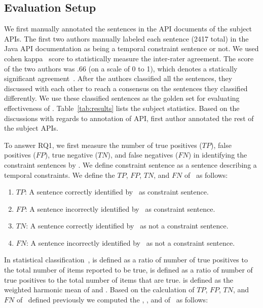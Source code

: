 \subsection{Evaluation Setup} 
We first manually annotated the sentences in the API documents of the subject APIs.
The first two authors manually labeled each sentence (2417 total) in the Java API documentation as being a temporal constraint sentence or not.
We used cohen kappa~\cite{carletta1996assessing} score to statistically measure
the inter-rater agreement.
The  score of the two authors was .66 (on a scale of 0 to 1), 
which denotes a statically significant agreement~\cite{carletta1996assessing}. 
After the authors classified all the sentences, they 
discussed with each other to reach a consensus on the sentences they classified differently.
We use these classified sentences as the golden set for evaluating effectiveness of \tool.
Table~\ref{tab:results} lists the subject statistics.
Based on the discussions with regards to annotation of  API, first author annotated the rest of the subject APIs. 



To answer RQ1, we first measure the number of true positives ($TP$), false positives ($FP$), true negative ($TN$), and false negatives ($FN$)
in identifying the constraint sentences by \tool.
We define constraint sentence as a sentence describing a temporal constraints.
We define the $TP$, $FP$, $TN$, and $FN$ of \tool\ as follows:

\begin{enumerate}
	\item $TP$: A sentence correctly identified by \tool\ as constraint sentence.
	\item $FP$: A sentence incorrectly identified by \tool\ as constraint sentence.
	\item $TN$: A sentence correctly identified by \tool\ as not a constraint sentence.
	\item $FN$: A sentence incorrectly identified by \tool\ as not a constraint sentence.
\end{enumerate}


In statistical classification~\cite{Olson08},  is defined as a ratio of
number of true positives to the total number of items reported to be true,
 is defined as a ratio of number of true positives to the total number
of items that are true.  is defined as the weighted harmonic mean of 
 and .
Based on the calculation of $TP$, $FP$, $TN$, and $FN$ of \tool\ defined
previously we computed the , , and  of \tool\ as follows:


